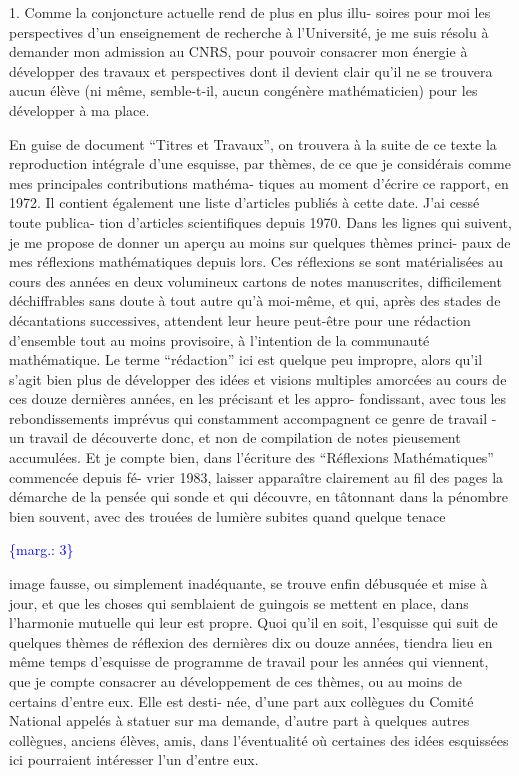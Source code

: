 \documentclass[11pt]{article}
\newcommand{\scanpage}[1]{\par\bigskip\noindent{\small\sffamily[scan #1]}\par}
\newcommand{\mspage}[1]{{\small\sffamily[p.\,#1]}}
\newcommand{\margin}[1]{\textcolor{blue}{\{\textsf{marg.:} #1\}}}
\begin{document}
1. Comme la conjoncture actuelle rend de plus en plus illu-%
soires pour moi les perspectives d'un enseignement de recherche à
l'Université, je me suis résolu à demander mon admission au CNRS, pour
pouvoir consacrer mon énergie à développer des travaux et perspectives
dont il devient clair qu'il ne se trouvera aucun élève (ni même,
semble-t-il, aucun congénère mathématicien) pour les développer à ma
place.

En guise de document ``Titres et Travaux'', on trouvera à la
suite de ce texte la reproduction intégrale d'une esquisse, par thèmes,
de ce que je considérais comme mes principales contributions mathéma-%
tiques au moment d'écrire ce rapport, en 1972. Il contient également
une liste d'articles publiés à cette date. J'ai cessé toute publica-%
tion d'articles scientifiques depuis 1970. Dans les lignes qui suivent,
je me propose de donner un aperçu au moins sur quelques thèmes princi-%
paux de mes réflexions mathématiques depuis lors. Ces réflexions se
sont matérialisées au cours des années en deux volumineux cartons de
notes manuscrites, difficilement déchiffrables sans doute à tout autre
qu'à moi-même, et qui, après des stades de décantations successives,
attendent leur heure peut-être pour une rédaction d'ensemble tout au
moins provisoire, à l'intention de la communauté mathématique. Le
terme ``rédaction'' ici est quelque peu impropre, alors qu'il s'agit
bien plus de développer des idées et visions multiples amorcées au
cours de ces douze dernières années, en les précisant et les appro-%
fondissant, avec tous les rebondissements imprévus qui constamment
accompagnent ce genre de travail - un travail de découverte donc, et
non de compilation de notes pieusement accumulées. Et je compte bien,
dans l'écriture des ``Réflexions Mathématiques'' commencée depuis fé-%
vrier 1983, laisser apparaître clairement au fil des pages la démarche
de la pensée qui sonde et qui découvre, en tâtonnant dans la pénombre
bien souvent, avec des trouées de lumière subites quand quelque tenace

\margin{3}

\clearpage
\scanpage{119/4}
\mspage{2}

image fausse, ou simplement inadéquante, se trouve enfin débusquée
et mise à jour, et que les choses qui semblaient de guingois se
mettent en place, dans l'harmonie mutuelle qui leur est propre.
\qquad Quoi qu'il en soit, l'esquisse qui suit de quelques
thèmes de réflexion des dernières dix ou douze années, tiendra
lieu en même temps d'esquisse de programme de travail pour les
années qui viennent, que je compte consacrer au développement de
ces thèmes, ou au moins de certains d'entre eux. Elle est desti-%
née, d'une part aux collègues du Comité National appelés à statuer
sur ma demande, d'autre part à quelques autres collègues, anciens
élèves, amis, dans l'éventualité où certaines des idées esquissées
ici pourraient intéresser l'un d'entre eux.
\end{document}
